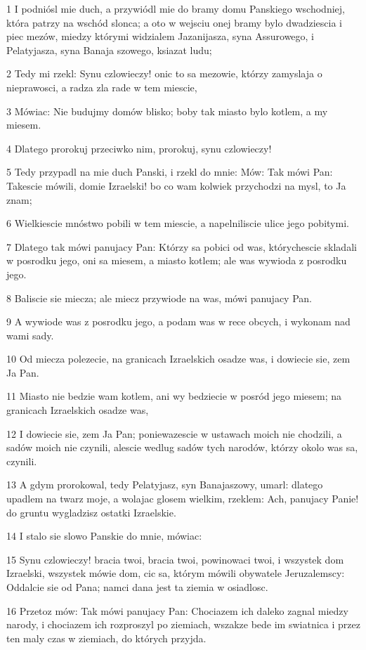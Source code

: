 \par 1 I podniósl mie duch, a przywiódl mie do bramy domu Panskiego wschodniej, która patrzy na wschód slonca; a oto w wejsciu onej bramy bylo dwadziescia i piec mezów, miedzy którymi widzialem Jazanijasza, syna Assurowego, i Pelatyjasza, syna Banaja szowego, ksiazat ludu;
\par 2 Tedy mi rzekl: Synu czlowieczy! onic to sa mezowie, którzy zamyslaja o nieprawosci, a radza zla rade w tem miescie,
\par 3 Mówiac: Nie budujmy domów blisko; boby tak miasto bylo kotlem, a my miesem.
\par 4 Dlatego prorokuj przeciwko nim, prorokuj, synu czlowieczy!
\par 5 Tedy przypadl na mie duch Panski, i rzekl do mnie: Mów: Tak mówi Pan: Takescie mówili, domie Izraelski! bo co wam kolwiek przychodzi na mysl, to Ja znam;
\par 6 Wielkiescie mnóstwo pobili w tem miescie, a napelniliscie ulice jego pobitymi.
\par 7 Dlatego tak mówi panujacy Pan: Którzy sa pobici od was, którychescie skladali w posrodku jego, oni sa miesem, a miasto kotlem; ale was wywioda z posrodku jego.
\par 8 Baliscie sie miecza; ale miecz przywiode na was, mówi panujacy Pan.
\par 9 A wywiode was z posrodku jego, a podam was w rece obcych, i wykonam nad wami sady.
\par 10 Od miecza polezecie, na granicach Izraelskich osadze was, i dowiecie sie, zem Ja Pan.
\par 11 Miasto nie bedzie wam kotlem, ani wy bedziecie w posród jego miesem; na granicach Izraelskich osadze was,
\par 12 I dowiecie sie, zem Ja Pan; poniewazescie w ustawach moich nie chodzili, a sadów moich nie czynili, alescie wedlug sadów tych narodów, którzy okolo was sa, czynili.
\par 13 A gdym prorokowal, tedy Pelatyjasz, syn Banajaszowy, umarl: dlatego upadlem na twarz moje, a wolajac glosem wielkim, rzeklem: Ach, panujacy Panie! do gruntu wygladzisz ostatki Izraelskie.
\par 14 I stalo sie slowo Panskie do mnie, mówiac:
\par 15 Synu czlowieczy! bracia twoi, bracia twoi, powinowaci twoi, i wszystek dom Izraelski, wszystek mówie dom, cic sa, którym mówili obywatele Jeruzalemscy: Oddalcie sie od Pana; namci dana jest ta ziemia w osiadlosc.
\par 16 Przetoz mów: Tak mówi panujacy Pan: Chociazem ich daleko zagnal miedzy narody, i chociazem ich rozproszyl po ziemiach, wszakze bede im swiatnica i przez ten maly czas w ziemiach, do których przyjda.

